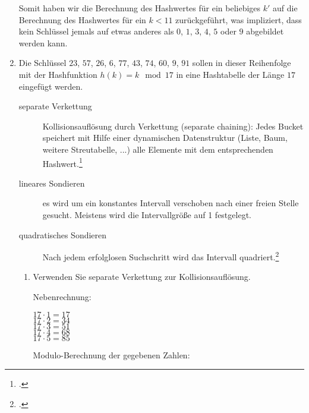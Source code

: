 \documentclass{lehramt-informatik-aufgabe}
\begin{document}
\begin{enumerate}
\begin{antwort}
Somit haben wir die Berechnung des Hashwertes für ein beliebiges $k'$
auf die Berechnung des Hashwertes für ein $k < 11$ zurückgeführt, was
impliziert, dass kein Schlüssel jemals auf etwas anderes als $0$, $1$,
$3$, $4$, $5$ oder $9$ abgebildet werden kann.
\end{antwort}


\item  Die Schlüssel $23$, $57$, $26$, $6$, $77$, $43$, $74$, $60$, $9$,
$91$ sollen in dieser Reihenfolge mit der Hashfunktion $h(k) = k \mod
17$ in eine Hashtabelle der Länge $17$ eingefügt werden.

\begin{antwort}
\begin{exkurs}[Sondieren]
\begin{description}
\item[separate Verkettung]
Kollisionsauflösung durch Verkettung (separate chaining): Jedes Bucket
speichert mit Hilfe einer dynamischen Datenstruktur (Liste, Baum,
weitere Streutabelle, ...) alle Elemente mit dem entsprechenden
Hashwert.\footcite[Seite 32]{aud:fs:tafeluebung-10}

\item[lineares Sondieren]
es wird um ein konstantes Intervall verschoben nach einer freien Stelle
gesucht. Meistens wird die Intervallgröße auf 1 festgelegt.

\item[quadratisches Sondieren]
Nach jedem erfolglosen Suchschritt wird das Intervall
quadriert.\footcite{wiki:hashtabelle}
\end{description}
\end{exkurs}
\end{antwort}

\begin{enumerate}


\item Verwenden Sie separate Verkettung zur Kollisionsauflösung.

\begin{antwort}
Nebenrechnung:

$17 \cdot 1 = 17$\\
$17 \cdot 2 = 34$\\
$17 \cdot 3 = 51$\\
$17 \cdot 4 = 68$\\
$17 \cdot 5 = 85$

Modulo-Berechnung der gegebenen Zahlen:


\end{antwort}
\end{enumerate}
\end{enumerate}
\end{document}
